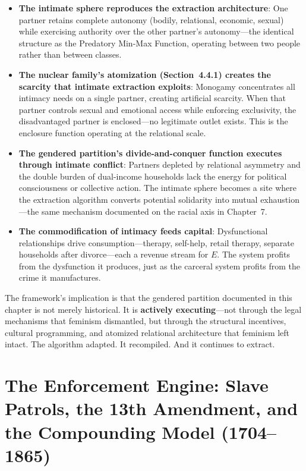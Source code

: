 \documentclass[12pt,openany]{book}
\begin{document}
\begin{itemize}
    \item \textbf{The intimate sphere reproduces the extraction architecture}: One partner retains complete autonomy (bodily, relational, economic, sexual) while exercising authority over the other partner's autonomy---the identical structure as the Predatory Min-Max Function, operating between two people rather than between classes.
    
    \item \textbf{The nuclear family's atomization (Section~4.4.1) creates the scarcity that intimate extraction exploits}: Monogamy concentrates all intimacy needs on a single partner, creating artificial scarcity. When that partner controls sexual and emotional access while enforcing exclusivity, the disadvantaged partner is enclosed---no legitimate outlet exists. This is the enclosure function operating at the relational scale.
    
    \item \textbf{The gendered partition's divide-and-conquer function executes through intimate conflict}: Partners depleted by relational asymmetry and the double burden of dual-income households lack the energy for political consciousness or collective action. The intimate sphere becomes a site where the extraction algorithm converts potential solidarity into mutual exhaustion---the same mechanism documented on the racial axis in Chapter~7.
    
    \item \textbf{The commodification of intimacy feeds capital}: Dysfunctional relationships drive consumption---therapy, self-help, retail therapy, separate households after divorce---each a revenue stream for $E$. The system profits from the dysfunction it produces, just as the carceral system profits from the crime it manufactures.
\end{itemize}

The framework's implication is that the gendered partition documented in this chapter is not merely historical. It is \textbf{actively executing}---not through the legal mechanisms that feminism dismantled, but through the structural incentives, cultural programming, and atomized relational architecture that feminism left intact. The algorithm adapted. It recompiled. And it continues to extract.

\chapter{The Enforcement Engine: Slave Patrols, the 13th Amendment, and the Compounding Model (1704--1865)}
\end{document}

